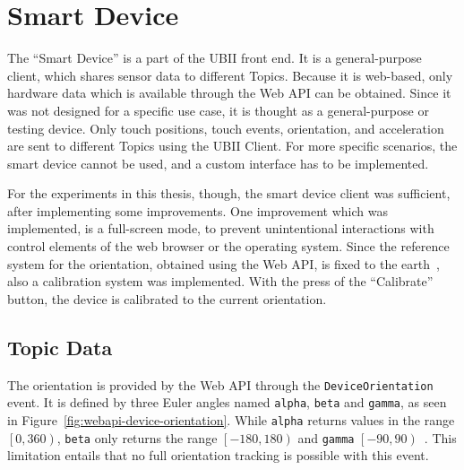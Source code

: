 \section{Smart Device}\label{section:smart-device}

The \enquote{Smart Device} is a part of the \ac{UBII} front end. It is a general-purpose client, which shares sensor data to different Topics. Because it is web-based, only hardware data which is available through the Web \ac{API} can be obtained. Since it was not designed for a specific use case, it is thought as a general-purpose or testing device. Only touch positions, touch events, orientation, and acceleration are sent to different Topics using the \ac{UBII} Client. For more specific scenarios, the smart device cannot be used, and a custom interface has to be implemented. 

For the experiments in this thesis, though, the smart device client was sufficient, after implementing some improvements. One improvement which was implemented, is a full-screen mode, to prevent unintentional interactions with control elements of the web browser or the operating system. Since the reference system for the orientation, obtained using the Web \ac{API}, is fixed to the earth~\cite[Chapter~4.1]{DevicesandSensorsWorkingGroup.2019}, also a calibration system was implemented. With the press of the \enquote{Calibrate} button, the device is calibrated to the current orientation.


\subsection{Topic Data}\label{subsection:topic-data}

The orientation is provided by the Web \ac{API} through the \lstinline{DeviceOrientation} event. It is defined by three Euler angles named \lstinline{alpha}, \lstinline{beta} and \lstinline{gamma}, as seen in Figure~\ref{fig:webapi-device-orientation}.
While \lstinline{alpha} returns values in the range \(\left[0, 360\right)\), \lstinline{beta} only returns the range \(\left[-180, 180\right)\) and \lstinline{gamma} \(\left[-90, 90\right)\)~\cite[Chapter~4.1]{DevicesandSensorsWorkingGroup.2019}. %
This limitation entails that no full orientation tracking is possible with this event. 

